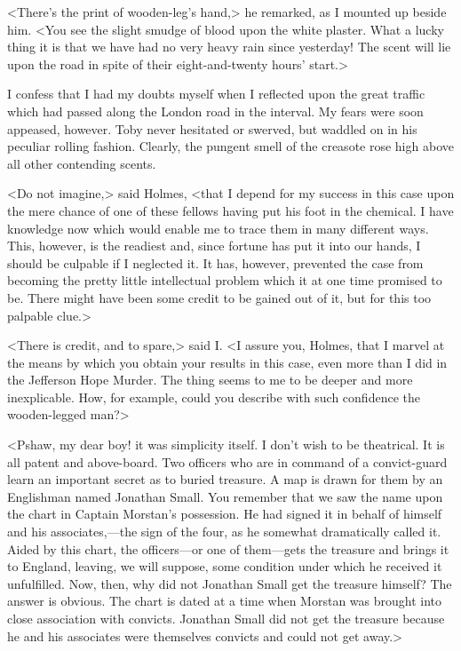<There's the print of wooden-leg's hand,> he remarked, as I mounted up beside him. <You see the slight smudge of blood upon the white plaster. What a lucky thing it is that we have had no very heavy rain since yesterday! The scent will lie upon the road in spite of their eight-and-twenty hours' start.>

I confess that I had my doubts myself when I reflected upon the great traffic which had passed along the London road in the interval. My fears were soon appeased, however. Toby never hesitated or swerved, but waddled on in his peculiar rolling fashion. Clearly, the pungent smell of the creasote rose high above all other contending scents.

<Do not imagine,> said Holmes, <that I depend for my success in this case upon the mere chance of one of these fellows having put his foot in the chemical. I have knowledge now which would enable me to trace them in many different ways. This, however, is the readiest and, since fortune has put it into our hands, I should be culpable if I neglected it. It has, however, prevented the case from becoming the pretty little intellectual problem which it at one time promised to be. There might have been some credit to be gained out of it, but for this too palpable clue.>

<There is credit, and to spare,> said I\@. <I assure you, Holmes, that I marvel at the means by which you obtain your results in this case, even more than I did in the Jefferson Hope Murder. The thing seems to me to be deeper and more inexplicable. How, for example, could you describe with such confidence the wooden-legged man?>

<Pshaw, my dear boy! it was simplicity itself. I don't wish to be theatrical. It is all patent and above-board. Two officers who are in command of a convict-guard learn an important secret as to buried treasure. A map is drawn for them by an Englishman named Jonathan Small. You remember that we saw the name upon the chart in Captain Morstan's possession. He had signed it in behalf of himself and his associates,—the sign of the four, as he somewhat dramatically called it. Aided by this chart, the officers—or one of them—gets the treasure and brings it to England, leaving, we will suppose, some condition under which he received it unfulfilled. Now, then, why did not Jonathan Small get the treasure himself? The answer is obvious. The chart is dated at a time when Morstan was brought into close association with convicts. Jonathan Small did not get the treasure because he and his associates were themselves convicts and could not get away.>

